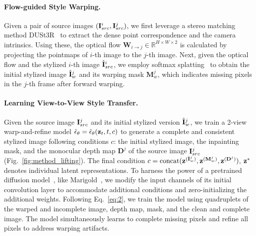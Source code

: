 \paragraph{Flow-guided Style Warping.}
Given a pair of source images $(\mathbf{I}_{src}^i, \mathbf{I}_{src}^j)$, we first leverage a stereo matching method DUSt3R~\cite{wang2024dust3r} to extract the dense point correspondence and the camera intrinsics. Using these, the optical flow $\mathbf{W}_{i\rightarrow j}\in \mathbb{R}^{H \times W \times 2}$ is calculated by projecting the pointmaps of $i$-th image to the $j$-th image. Next, given the optical flow and the stylized $i$-th image $\hat{\mathbf{I}}_{src}^i$, we employ softmax splatting~\cite{softslatting_CVPR_2020} to obtain the initial stylized image $\hat{\mathbf{I}}_{w}^j$ and its warping mask $\mathbf{M}_{w}^j$, which indicates missing pixels in the $j$-th frame after forward warping. 


\paragraph{Learning View-to-View Style Transfer.} 
Given the source image $\mathbf{I}_{src}^j$ and its initial stylized version $\hat{\mathbf{I}}_{w}^j$, we train a 2-view warp-and-refine model $\hat{\epsilon}_{\theta}=\hat{\epsilon}_\theta(\mathbf{z}_t, t, c)$ to generate a complete and consistent stylized image following conditions $c$: the initial stylized image, the inpainting mask, and the monocular depth map $\mathbf{D}^j$ of the source image $\mathbf{I}_{src}^j$ (Fig.~\ref{fig:method_lifting}). The final condition $c=\mathrm{concat}(\mathbf{z}^{(\hat{\mathbf{I}}_{w}^j)}, \mathbf{z}^{(\mathbf{M}_{w}^j)}, \mathbf{z}^{(\mathbf{D}^j)})$, $\mathbf{z}^*$ denotes individual latent representations. To harness the power of a pretrained diffusion model~\cite{podell2024sdxl}, like Marigold~\cite{ke2023marigold}, we modify the input channels of its initial convolution layer to accommodate additional conditions and zero-initializing the additional weights. Following Eq.~\eqref{eq:2}, we train the model using quadruplets of the warped and incomplete image, depth map, mask, and the clean and complete image. The model simultaneously learns to complete missing pixels and refine all pixels to address warping artifacts.

